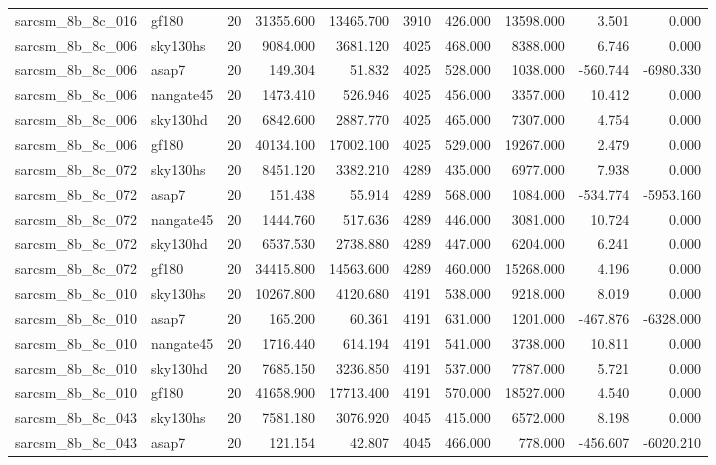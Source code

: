 \begin{tabular}{llrrrrrrrr}
sarcsm\_8b\_8c\_016 & gf180 & 20 & 31355.600 & 13465.700 & 3910 & 426.000 & 13598.000 & 3.501 & 0.000 \\
sarcsm\_8b\_8c\_006 & sky130hs & 20 & 9084.000 & 3681.120 & 4025 & 468.000 & 8388.000 & 6.746 & 0.000 \\
sarcsm\_8b\_8c\_006 & asap7 & 20 & 149.304 & 51.832 & 4025 & 528.000 & 1038.000 & -560.744 & -6980.330 \\
sarcsm\_8b\_8c\_006 & nangate45 & 20 & 1473.410 & 526.946 & 4025 & 456.000 & 3357.000 & 10.412 & 0.000 \\
sarcsm\_8b\_8c\_006 & sky130hd & 20 & 6842.600 & 2887.770 & 4025 & 465.000 & 7307.000 & 4.754 & 0.000 \\
sarcsm\_8b\_8c\_006 & gf180 & 20 & 40134.100 & 17002.100 & 4025 & 529.000 & 19267.000 & 2.479 & 0.000 \\
sarcsm\_8b\_8c\_072 & sky130hs & 20 & 8451.120 & 3382.210 & 4289 & 435.000 & 6977.000 & 7.938 & 0.000 \\
sarcsm\_8b\_8c\_072 & asap7 & 20 & 151.438 & 55.914 & 4289 & 568.000 & 1084.000 & -534.774 & -5953.160 \\
sarcsm\_8b\_8c\_072 & nangate45 & 20 & 1444.760 & 517.636 & 4289 & 446.000 & 3081.000 & 10.724 & 0.000 \\
sarcsm\_8b\_8c\_072 & sky130hd & 20 & 6537.530 & 2738.880 & 4289 & 447.000 & 6204.000 & 6.241 & 0.000 \\
sarcsm\_8b\_8c\_072 & gf180 & 20 & 34415.800 & 14563.600 & 4289 & 460.000 & 15268.000 & 4.196 & 0.000 \\
sarcsm\_8b\_8c\_010 & sky130hs & 20 & 10267.800 & 4120.680 & 4191 & 538.000 & 9218.000 & 8.019 & 0.000 \\
sarcsm\_8b\_8c\_010 & asap7 & 20 & 165.200 & 60.361 & 4191 & 631.000 & 1201.000 & -467.876 & -6328.000 \\
sarcsm\_8b\_8c\_010 & nangate45 & 20 & 1716.440 & 614.194 & 4191 & 541.000 & 3738.000 & 10.811 & 0.000 \\
sarcsm\_8b\_8c\_010 & sky130hd & 20 & 7685.150 & 3236.850 & 4191 & 537.000 & 7787.000 & 5.721 & 0.000 \\
sarcsm\_8b\_8c\_010 & gf180 & 20 & 41658.900 & 17713.400 & 4191 & 570.000 & 18527.000 & 4.540 & 0.000 \\
sarcsm\_8b\_8c\_043 & sky130hs & 20 & 7581.180 & 3076.920 & 4045 & 415.000 & 6572.000 & 8.198 & 0.000 \\
sarcsm\_8b\_8c\_043 & asap7 & 20 & 121.154 & 42.807 & 4045 & 466.000 & 778.000 & -456.607 & -6020.210 \\

\end{tabular}
